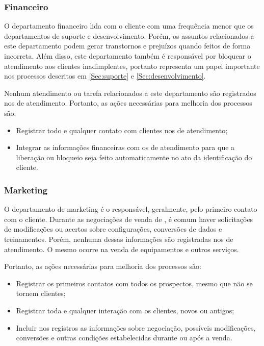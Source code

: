 \subsubsection{Financeiro}

O departamento financeiro lida com o cliente com uma frequência menor que os departamentos de suporte e desenvolvimento. Porém, os assuntos relacionados a este departamento podem gerar transtornos e prejuízos quando feitos de forma incorreta. Além disso, este departamento também é responsável por bloquear o atendimento aos clientes inadimplentes, portanto representa um papel importante nos processos descritos em \ref{Sec:suporte} e \ref{Sec:desenvolvimento}.

Nenhum atendimento ou tarefa relacionados a este departamento são registrados nos \sws de atendimento. Portanto, as ações necessárias para melhoria dos processos são:

\begin{itemize}

\item Registrar todo e qualquer contato com clientes nos \sws de atendimento;

\item Integrar as informações financeiras com os \sws de atendimento para que a liberação ou bloqueio seja feito automaticamente no ato da identificação do cliente.

\end{itemize}

\subsubsection{Marketing}

O departamento de marketing é o responsável, geralmente, pelo primeiro contato com o cliente. Durante as negociações de venda de \sw, é comum haver solicitações de modificações ou acertos sobre configurações, conversões de dados e treinamentos. Porém, nenhuma dessas informações são registradas nos \sws de atendimento. O mesmo ocorre na venda de equipamentos e outros serviços.

Portanto, as ações necessárias para melhoria dos processos são:

\begin{itemize}

\item Registrar os primeiros contatos com todos os prospectos, mesmo que não se tornem clientes;

\item Registrar toda e qualquer interação com os clientes, novos ou antigos;

\item Incluir nos registros as informações sobre negociação, possíveis modificações, conversões e outras condições estabelecidas durante ou após a venda.

\end{itemize}

